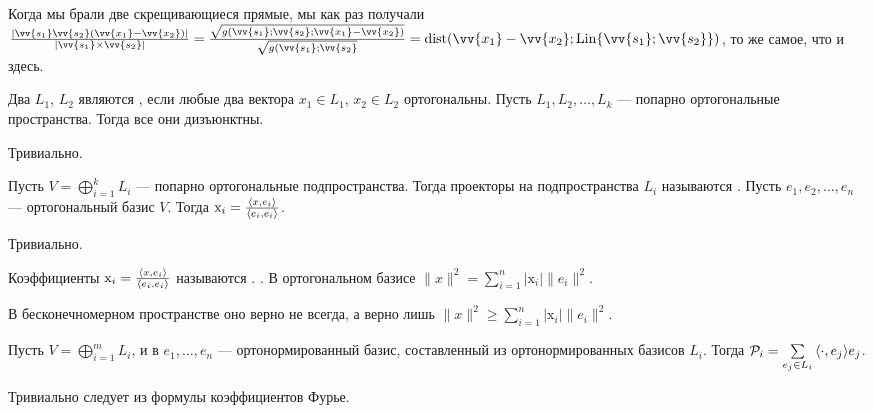 \documentclass{article}
\let\vec\vv
\begin{document}
\begin{itemize}
\begin{Proof}
        \end{Proof}
        \begin{Example}
            Когда мы брали две скрещивающиеся прямые, мы как раз получали $\frac{|\vec{s_1}\vec{s_2}(\vec{x_1}-\vec{x_2})|}{|\vec{s_1}\times\vec{s_2}|}=\frac{\sqrt{g(\vec{s_1};\vec{s_2};\vec{x_1}-\vec{x_2})}}{\sqrt{g(\vec{s_1};\vec{s_2}}}=\operatorname{dist}(\vec{x_1}-\vec{x_2};\Lin\{\vec{s_1};\vec{s_2}\})$, то же самое, что и здесь.
        \end{Example}
        \dfn Два  $L_1$, $L_2$ являются , если любые два вектора $x_1\in L_1$, $x_2\in L_2$ ортогональны.
        \thm Пусть $L_1,L_2,\ldots,L_k$ --- попарно ортогональные пространства. Тогда все они дизъюнктны.
        \begin{Proof}
            Тривиально.
        \end{Proof}
        \dfn Пусть $V=\bigoplus_{i=1}^kL_i$ --- попарно ортогональные подпространства. Тогда проекторы на подпространства $L_i$ называются .
        \thm Пусть $e_1,e_2,\ldots,e_n$ --- ортогональный базис $V$. Тогда $\mathrm x_i=\frac{{\left\langle{x},{e_i}\right\rangle}}{{\left\langle{e_i},{e_i}\right\rangle}}$.
        \begin{Proof}
            Тривиально.
        \end{Proof}
        \dfn Коэффициенты $\mathrm x_i=\frac{{\left\langle{x},{e_i}\right\rangle}}{{\left\langle{e_i},{e_i}\right\rangle}}$ называются .
        \thm {}. В ортогональном базисе $\|x\|^2=\sum\limits_{i=1}^n|\mathrm x_i|\|e_i\|^2$.
        \begin{Comment}
            В бесконечномерном пространстве оно верно не всегда, а верно лишь  $\|x\|^2\geqslant\sum\limits_{i=1}^n|\mathrm x_i|\|e_i\|^2$.
        \end{Comment}
        \thm Пусть $V=\bigoplus_{i=1}^mL_i$, и в $e_1,\ldots,e_n$ --- ортонормированный базис, составленный из ортонормированных базисов $L_i$. Тогда ${\mathcal{P}}_i=\sum\limits_{e_j\in L_i}{\left\langle{\cdot},{e_j}\right\rangle}e_j$.
        \begin{Proof}
            Тривиально следует из формулы коэффициентов Фурье.
        \end{Proof}
    \end{itemize}
\end{document}
